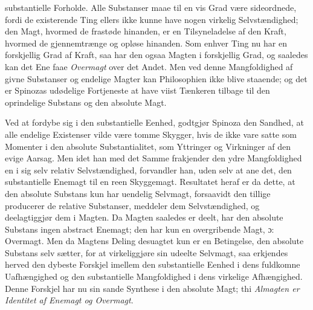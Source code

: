 \documentclass[12pt]{book}
\newcommand{\dsi}{\textup{ɔ:}}
\newcommand{\opage}[1]{\marginnote{\footnotesize\textit{[#1]}}}
\begin{document}
substantielle Forholde. Alle Substanser maae til en vis Grad være sideordnede, fordi de
existerende Ting ellers ikke kunne have nogen virkelig Selvstændighed; den Magt,
hvormed de frastøde hinanden, er en Tilsyneladelse af den Kraft, hvormed de
gjennemtrænge og opløse hinanden. Som enhver Ting nu har en forskjellig Grad af Kraft,
saa har den ogsaa Magten i forskjellig Grad, og saaledes kan det Ene faae
\emph{Overmagt} over det Andet. Men ved denne Mangfoldighed af givne Substanser og
endelige Magter kan Philosophien ikke blive staaende; og det er Spinozas udødelige
Fortjeneste at have viist Tænkeren tilbage til den oprindelige Substans og den absolute
Magt.

Ved at fordybe sig i den substantielle Eenhed, godtgjør Spinoza den Sandhed, at alle
endelige Existenser vilde være tomme Skygger, hvis de ikke vare satte som Momenter i
den absolute Substantialitet, som Yttringer og Virkninger af den evige Aarsag. Men idet
han med det Samme frakjender den ydre Mangfoldighed en i sig selv relativ
Selvstændighed, forvandler han, uden selv at ane det, den substantielle Enemagt til en
reen Skyggemagt. Resultatet heraf er da dette, at den absolute Substans kun har
uendelig Selvmagt, forsaavidt den tillige producerer de relative Substanser, meddeler
dem Selvstændighed, og deelagtiggjør dem i Magten. Da Magten saaledes er deelt, har den
absolute Substans ingen abstract Enemagt; den har kun en overgribende Magt, \dsi{}
\opage{168} %
Overmagt. Men da Magtens Deling desuagtet kun er en Betingelse, den absolute Substans
selv sætter, for at virkeliggjøre sin udeelte Selvmagt, saa erkjendes herved den
dybeste Forskjel imellem den substantielle Eenhed i dens fuldkomne Uafhængighed og den
substantielle Mangfoldighed i dens virkelige Afhængighed. Denne Forskjel har nu sin
sande Synthese i den absolute Magt; thi \emph{Almagten er Identitet af Enemagt og
Overmagt}.
\end{document}
